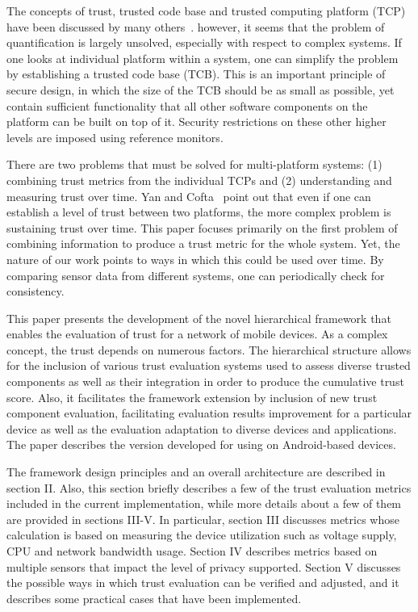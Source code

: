 The concepts of trust, trusted code base and trusted computing platform (TCP) have been discussed by many others~\cite{}.
however, it seems that the problem  of quantification is largely unsolved, especially with respect to complex systems.
If one looks at individual platform within a system, one can simplify the problem by establishing a trusted code base (TCB).
This is an important principle of secure design, in which the size of the TCB should be as small as possible, yet contain
sufficient functionality that all other software components on the platform can be built on top of it.  Security restrictions on 
these other higher levels are imposed using reference monitors.  

There are two problems that must be solved for multi-platform systems: (1) combining trust metrics from the individual 
TCPs and (2) understanding and measuring trust over time.
Yan and Cofta~\cite{yan_2004} point out that even if one can establish a level of trust between two platforms, 
the more complex problem is sustaining trust over time.  This paper focuses primarily on the first problem of combining
information to produce a trust metric for the whole system.  Yet, the nature of our work points to ways in which 
this could be used over time.  By comparing sensor data from different systems, one can periodically check for consistency.

This paper presents the development of the novel hierarchical framework that enables the  evaluation of trust for a network of 
mobile devices. As a complex concept, the trust depends on numerous factors. The hierarchical structure allows for the
inclusion of various trust evaluation systems used to assess diverse trusted components as well as their integration in 
order to produce the cumulative trust score. Also, it facilitates the framework extension by inclusion of new trust 
component evaluation, facilitating evaluation results improvement for a particular device as well as the evaluation 
adaptation to diverse devices and applications. 
The paper describes the version developed for using on Android-based devices.

The framework design principles and an overall architecture are described in section II. Also, this section 
 briefly describes a few of the trust evaluation metrics included in the current implementation,
while more details about a few of them are provided in sections III-V. In particular, section III discusses metrics whose 
calculation is based on measuring the device utilization such as voltage supply, CPU and network bandwidth usage. 
Section IV describes metrics based on multiple sensors that impact the level of privacy supported. 
Section V discusses the possible ways in which trust evaluation can be verified and adjusted, and it 
describes some practical cases that have been implemented.
